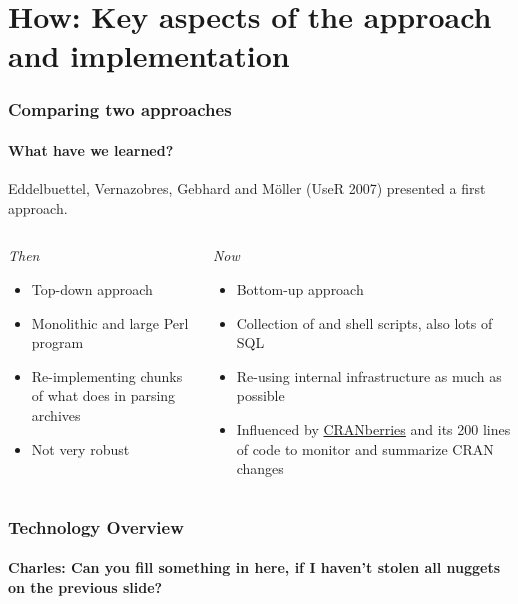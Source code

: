 \documentclass[smaller,compress]{beamer}
\begin{document}
\section[How]{How: Key aspects of the approach and implementation}
\begin{frame}
  \frametitle{Comparing two approaches}
  \framesubtitle{What have we learned?}

  Eddelbuettel, Vernazobres, Gebhard and M\"{o}ller (UseR 2007) presented a first
  approach.

  \MedSkip

  \begin{columns}
    \begin{column}{2in}
      \textsl{Then}
      \begin{itemize}
      \item Top-down approach 
      \item Monolithic and large Perl program 
      \item Re-implementing chunks of what \R does in parsing archives
      \item Not very robust
      \end{itemize}
    \end{column}      

    \begin{column}{2in}
      \textsl{Now}
      \begin{itemize}
      \item Bottom-up approach
      \item Collection of \R and shell scripts, also lots of SQL
      \item Re-using \R internal infrastructure as much as possible
      \item Influenced by %
        \href{http://dirk.eddelbuettel.com/cranberries/}{CRANberries} and its
        200 lines of \R code to monitor and summarize CRAN changes
      \end{itemize}
    \end{column}      
  \end{columns}
\end{frame}

\begin{frame}
  \frametitle{Technology Overview}
  \framesubtitle{Charles: Can you fill something in here, if I haven't stolen
    all nuggets on the previous slide?}

\end{frame}
\end{document}

